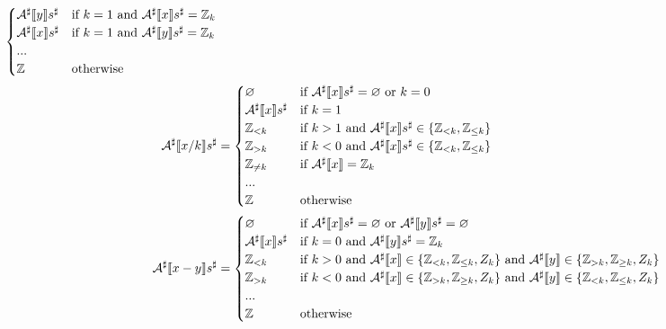 \begin{exercise}
\begin{align*}
\begin{cases}
            \Asharp{y} s^\sharp & \text{if } k = 1 \text{ and } \Asharp{x} s^\sharp = \Z_k \\
            \Asharp{x} s^\sharp & \text{if } k = 1 \text{ and } \Asharp{y} s^\sharp = \Z_k \\
            ... \\
            \Z & \text{otherwise}
        \end{cases} \\
        \Asharp{x / k} s^\sharp &= \begin{cases}
            \varnothing & \text{if } \Asharp{x} s^\sharp = \varnothing \text{ or } k = 0 \\
            \Asharp{x} s^\sharp & \text{if } k = 1 \\
            \Z_{< k} & \text{if } k > 1 \text{ and } \Asharp{x} s^\sharp \in \{ \Z_{< k}, \Z_{\leq k} \} \\
            \Z_{> k} & \text{if } k < 0 \text{ and } \Asharp{x} s^\sharp \in \{ \Z_{< k}, \Z_{\leq k} \} \\
            \Z_{\neq k} & \text{if } \Asharp{x} = \Z_k \\
            ... \\
            \Z & \text{otherwise}
        \end{cases} \\
        \Asharp{x - y} s^\sharp &= \begin{cases}
            \varnothing & \text{if } \Asharp{x} s^\sharp = \varnothing \text{ or } \Asharp{y} s^\sharp = \varnothing \\
            \Asharp{x} s^\sharp & \text{if } k = 0 \text{ and } \Asharp{y} s^\sharp = \Z_k \\
            \Z_{< k} & \text{if } k > 0 \text{ and } \Asharp{x} \in \{ \Z_{< k}, \Z_{\leq k}, Z_k \} \text{ and } \Asharp{y} \in \{ \Z_{> k}, \Z_{\geq k}, Z_k \} \\
            \Z_{> k} & \text{if } k < 0 \text{ and } \Asharp{x} \in \{ \Z_{> k}, \Z_{\geq k}, Z_k \} \text{ and } \Asharp{y} \in \{ \Z_{< k}, \Z_{\leq k}, Z_k \} \\
            ... \\
            \Z & \text{otherwise}
        \end{cases} \\
    \end{align*}
\end{exercise}
